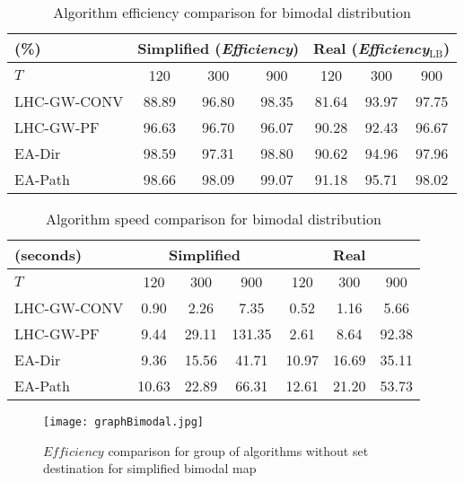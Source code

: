\begin{table}
	\centering
		\begin{tabular}
			{|l|c|c|c|c|c|c|}
			\hline
			(\%) & \multicolumn{3}{|c|}{Simplified ({\it{Efficiency}})} & \multicolumn{3}{|c|}{Real ({\it{Efficiency$_\textrm{LB}$}})} \\
			\hline
			$T$ & 120 & 300 & 900	& 120 & 300 & 900 \\
			\hline
			LHC-GW-CONV & 88.89 & 96.80 & 98.35 & 81.64 & 93.97 & 97.75 \\
			\hline			
			LHC-GW-PF	& 96.63 & 96.70 & 96.07 & 90.28 & 92.43 & 96.67 \\ 
			\hline
			EA-Dir & 98.59 & 97.31 & 98.80 & 90.62 & 94.96 & 97.96 \\
			\hline
			EA-Path & 98.66 & 98.09 & 99.07 & 91.18 & 95.71 & 98.02 \\
			\hline
		\end{tabular}
\caption{Algorithm efficiency comparison for bimodal distribution}
\label{EBimodalSimplified}
\end{table}

\begin{table}
	\centering
		\begin{tabular}
			{|l|c|c|c|c|c|c|}
			\hline
			(seconds) & \multicolumn{3}{|c|}{Simplified} & \multicolumn{3}{|c|}{Real} \\
			\hline
			$T$ & 120 & 300 & 900	& 120 & 300 & 900 \\
			\hline
			LHC-GW-CONV & 0.90 & 2.26 & 7.35 & 0.52 & 1.16 & 5.66 \\
			\hline
			LHC-GW-PF	& 9.44 & 29.11 & 131.35 & 2.61 & 8.64 & 92.38 \\
			\hline
			EA-Dir & 9.36 & 15.56 & 41.71 & 10.97 & 16.69 & 35.11 \\
			\hline
			EA-Path & 10.63 & 22.89 & 66.31 & 12.61 & 21.20 & 53.73 \\
			\hline
		\end{tabular}
\caption{Algorithm speed comparison for bimodal distribution}
\label{TBimodalSimplified}
\end{table}

\begin{figure}
\centering
\texttt{[image: graphBimodal.jpg]}
\caption{$\mathit{Efficiency}$ comparison for group of algorithms without set destination for simplified bimodal map}
\label{graphBimodal}
\end{figure}

